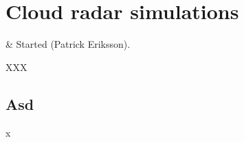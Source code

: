 \chapter{Cloud radar simulations}
 \label{sec:cradar}


 & Started (Patrick Eriksson).\\
\stophistory

XXX


\section{Asd}
\label{sec:asd}

x
